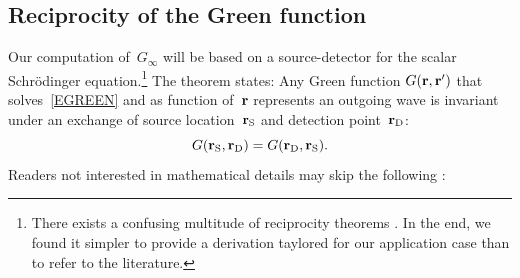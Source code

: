 \subsection{Reciprocity of the Green function}\label{SReci}

%
%

Our computation of~$G_\infty$ will be based on a source-detector 
for the scalar Schrödinger equation.\footnote
{There exists a confusing multitude of reciprocity theorems \cite{Pot04}.
In the end, we found it simpler to provide a derivation taylored for our application case
than to refer to the literature.}
The theorem states:
Any Green function $G(\mathbf{r},\mathbf{r}')$
that solves~\cref{EGREEN} and as function of~$\mathbf{r}$ represents an outgoing wave
is invariant under an exchange of source location~$\mathbf{r}_\text{S}$ and detection point~$\mathbf{r}_\text{D}$:
%
%
\begin{equation}\label{Erecip}
  G(\mathbf{r}_\text{S},\mathbf{r}_\text{D}) = G(\mathbf{r}_\text{D},\mathbf{r}_\text{S}).
\end{equation}
Readers not interested in mathematical details may skip the following :

